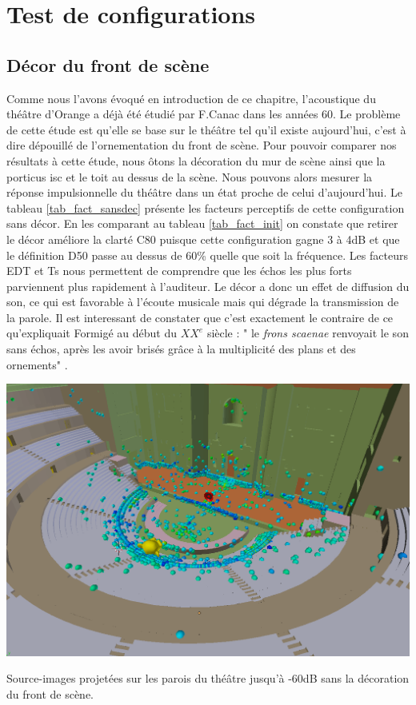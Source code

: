 		
\chapter{Test de configurations}
	\minitoc
	\newpage

\section{Décor du front de scène}

Comme nous l'avons évoqué en introduction de ce chapitre, l'acoustique du théâtre d'Orange a déjà été étudié par F.Canac dans les années 60. Le problème de cette étude est qu'elle se base sur le théâtre tel qu'il existe aujourd'hui, c'est à dire dépouillé de l'ornementation du front de scène. Pour pouvoir comparer nos résultats à cette étude, nous ôtons la décoration du mur de scène ainsi que la \gls{porticus isc} et le toit au dessus de la scène. Nous pouvons alors mesurer la réponse impulsionnelle du théâtre dans un état proche de celui d'aujourd'hui. Le tableau \ref{tab_fact_sansdec} présente les facteurs perceptifs de cette configuration sans décor. En les comparant au tableau \ref{tab_fact_init} on constate que retirer le décor améliore la clarté \gls{C80} puisque cette configuration gagne 3 à 4dB et que le définition \gls{D50} passe au dessus de 60\% quelle que soit la fréquence. Les facteurs \gls{EDT} et \gls{Ts} nous permettent de comprendre que les échos les plus forts parviennent plus rapidement à l'auditeur. Le décor a donc un effet de diffusion du son, ce qui est favorable à l'écoute musicale mais qui dégrade la transmission de la parole. Il est interessant de constater que c'est exactement le contraire de ce qu'expliquait Formigé au début du $XX^e$ siècle : " le \textit{frons scaenae} renvoyait le son sans échos, après les avoir brisés grâce à la multiplicité des plans et des ornements" \cite[p.43]{formige}.

\begin{figureth}
	\includegraphics[width=\linewidth]{images/SIsansDec}
	\caption{Source-images projetées sur les parois du théâtre jusqu'à -60dB sans la décoration du front de scène.}
	\label{SIsansDec}
\end{figureth}

